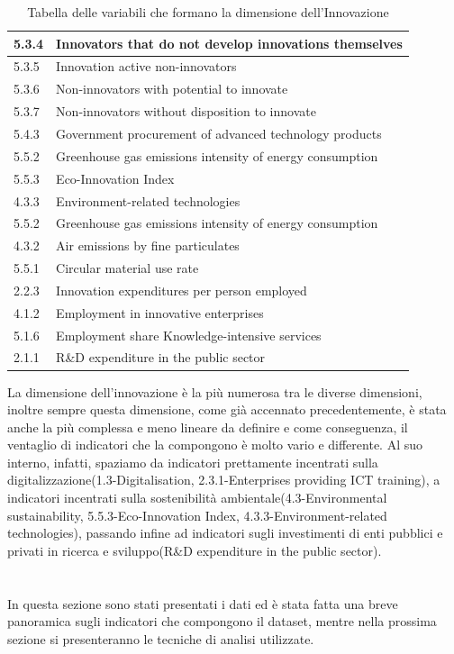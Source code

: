 \documentclass[a4paper,12pt, openright]{report}
\begin{document}
\begin{table}[h!]
\begin{tabular}{ |l|l| }
        \hline
        5.3.4 & Innovators that do not develop innovations themselves \\
        \hline
        5.3.5 & Innovation active non-innovators \\
        \hline
        5.3.6 & Non-innovators with potential to innovate \\
        \hline
        5.3.7 & Non-innovators without disposition to innovate \\
        \hline
        5.4.3 & Government procurement of advanced technology products \\
        \hline
        5.5.2 & Greenhouse gas emissions intensity of energy consumption \\
        \hline
        5.5.3 & Eco-Innovation Index \\
        \hline
        4.3.3 & Environment-related technologies \\
        \hline
        5.5.2 & Greenhouse gas emissions intensity of energy consumption \\
        \hline
        4.3.2 & Air emissions by fine particulates  \\
        \hline
        5.5.1 & Circular material use rate \\
        \hline
        2.2.3 & Innovation expenditures per person employed \\
        \hline
        4.1.2 & Employment in innovative enterprises  \\
        \hline
        5.1.6 & Employment share Knowledge-intensive services \\
        \hline
        2.1.1 & R\&D expenditure in the public sector \\
        \hline
      \end{tabular}
      \caption{Tabella delle variabili che formano la dimensione dell'Innovazione}
    \label{table:1}
\end{table}

La dimensione dell'innovazione è la più numerosa tra le diverse dimensioni, inoltre sempre questa dimensione, come già accennato precedentemente, è stata anche la più 
complessa e meno lineare da definire e come conseguenza, il ventaglio di indicatori che la compongono è molto vario e differente. Al suo interno, 
infatti, spaziamo da indicatori prettamente incentrati sulla digitalizzazione(1.3-Digitalisation, 2.3.1-Enterprises providing ICT training), a indicatori incentrati
sulla sostenibilità ambientale(4.3-Environmental sustainability, 5.5.3-Eco-Innovation Index, 4.3.3-Environment-related technologies), passando infine ad indicatori 
sugli investimenti di enti pubblici e privati in ricerca e sviluppo(R\&D expenditure in the public sector). \\
\\
\\
In questa sezione sono stati presentati i dati ed è stata fatta una breve panoramica sugli indicatori che compongono il dataset, mentre 
nella prossima sezione si presenteranno
le tecniche di analisi utilizzate. 
\newpage
\end{document}
